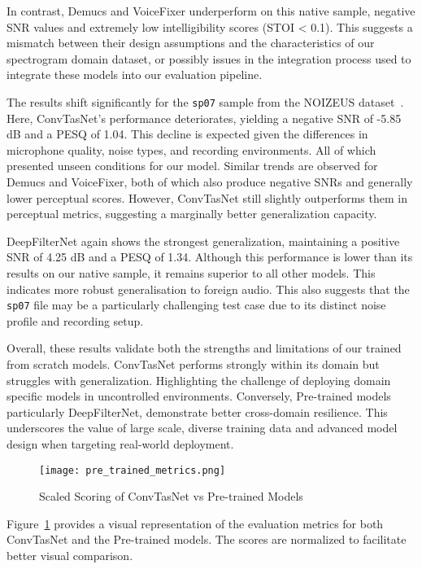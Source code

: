 In contrast, Demucs and VoiceFixer underperform on this native sample, negative SNR values and extremely low intelligibility scores (STOI < 0.1). This suggests a mismatch between their design assumptions and the characteristics of our spectrogram domain dataset, or possibly issues in the integration process used to integrate these models into our evaluation pipeline.

The results shift significantly for the \texttt{sp07} sample from the NOIZEUS dataset~\cite{hu2007subjective}. Here, ConvTasNet's performance deteriorates, yielding a negative SNR of -5.85 dB and a PESQ of 1.04. This decline is expected given the differences in microphone quality, noise types, and recording environments. All of which presented unseen conditions for our model. Similar trends are observed for Demucs and VoiceFixer, both of which also produce negative SNRs and generally lower perceptual scores. However, ConvTasNet still slightly outperforms them in perceptual metrics, suggesting a marginally better generalization capacity.

DeepFilterNet again shows the strongest generalization, maintaining a positive SNR of 4.25 dB and a PESQ of 1.34. Although this performance is lower than its results on our native sample, it remains superior to all other models. This indicates more robust generalisation to foreign audio. This also suggests that the \texttt{sp07} file may be a particularly challenging test case due to its distinct noise profile and recording setup.

Overall, these results validate both the strengths and limitations of our trained from scratch models. ConvTasNet performs strongly within its domain but struggles with generalization. Highlighting the challenge of deploying domain specific models in uncontrolled environments. Conversely, Pre-trained models particularly DeepFilterNet, demonstrate better cross-domain resilience. This underscores the value of large scale, diverse training data and advanced model design when targeting real-world deployment.

\begin{figure}[H]
\centering
\texttt{[image: pre\_trained\_metrics.png]}
\caption{Scaled Scoring of ConvTasNet vs Pre-trained Models}
\label{fig:pretrained_metrics}
\end{figure}
\noindent

Figure~\ref{fig:pretrained_metrics} provides a visual representation of the evaluation metrics for both ConvTasNet and the Pre-trained models. The scores are normalized to facilitate better visual comparison.

